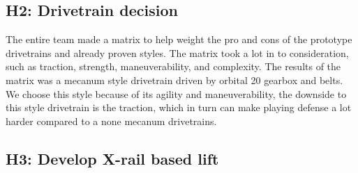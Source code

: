 \documentclass{article}
\begin{document}
\subsection{H2: Drivetrain decision}

The entire team made a matrix to help weight the pro and cons of the prototype drivetrains and already proven styles. The matrix took a lot in to consideration, such as traction, strength, maneuverability, and complexity. The results of the matrix was a mecanum style drivetrain driven by orbital 20 gearbox and belts. We choose this style because of its agility and maneuverability, the downside to this style drivetrain is the traction, which in turn can make playing defense a lot harder compared to a none mecanum drivetrains.  


\subsection{H3: Develop X-rail based lift}
\end{document}
